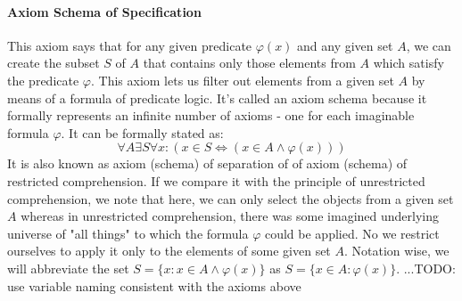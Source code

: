 \paragraph{Axiom Schema of Specification}
This axiom says that for any given predicate $\varphi(x)$ and any given set $A$, we can create the subset $S$ of $A$ that contains only those elements from $A$ which satisfy the predicate $\varphi$. This axiom lets us filter out elements from a given set $A$ by means of a formula of predicate logic. It's called an axiom schema because it formally represents an infinite number of axioms - one for each imaginable formula $\varphi$. It can be formally stated as:
\begin{equation}
\forall A \exists S \forall x: (x \in S \Leftrightarrow (x \in A \wedge \varphi(x)) )
\end{equation}
It is also known as axiom (schema) of separation of of axiom (schema) of restricted comprehension. If we compare it with the principle of unrestricted comprehension, we note that here, we can only select the objects from a given set $A$ whereas in unrestricted comprehension, there was some imagined underlying universe of "all things" to which the formula $\varphi$ could be applied. No we restrict ourselves to apply it only to the elements of some given set $A$. Notation wise, we will abbreviate the set $S = \{ x : x \in A \wedge \varphi(x) \}$ as $S = \{ x \in A :  \varphi(x) \}$. ...TODO: use variable naming consistent with the axioms above









